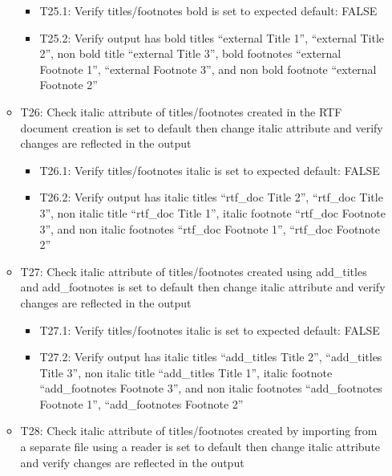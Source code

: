 \documentclass[]{article}
\providecommand{\tightlist}{%
  \setlength{\itemsep}{0pt}\setlength{\parskip}{0pt}}
\begin{document}
\begin{itemize}
\begin{itemize}
    \begin{itemize}
    \tightlist
    \item
      T25.1: Verify titles/footnotes bold is set to expected default:
      FALSE
    \item
      T25.2: Verify output has bold titles ``external Title 1'',
      ``external Title 2'', non bold title ``external Title 3'', bold
      footnotes ``external Footnote 1'', ``external Footnote 3'', and
      non bold footnote ``external Footnote 2''
    \end{itemize}
  \item
    T26: Check italic attribute of titles/footnotes created in the RTF
    document creation is set to default then change italic attribute and
    verify changes are reflected in the output

    \begin{itemize}
    \tightlist
    \item
      T26.1: Verify titles/footnotes italic is set to expected default:
      FALSE
    \item
      T26.2: Verify output has italic titles ``rtf\_doc Title 2'',
      ``rtf\_doc Title 3'', non italic title ``rtf\_doc Title 1'',
      italic footnote ``rtf\_doc Footnote 3'', and non italic footnotes
      ``rtf\_doc Footnote 1'', ``rtf\_doc Footnote 2''
    \end{itemize}
  \item
    T27: Check italic attribute of titles/footnotes created using
    add\_titles and add\_footnotes is set to default then change italic
    attribute and verify changes are reflected in the output

    \begin{itemize}
    \tightlist
    \item
      T27.1: Verify titles/footnotes italic is set to expected default:
      FALSE
    \item
      T27.2: Verify output has italic titles ``add\_titles Title 2'',
      ``add\_titles Title 3'', non italic title ``add\_titles Title 1'',
      italic footnote ``add\_footnotes Footnote 3'', and non italic
      footnotes ``add\_footnotes Footnote 1'', ``add\_footnotes Footnote
      2''
    \end{itemize}
  \item
    T28: Check italic attribute of titles/footnotes created by importing
    from a separate file using a reader is set to default then change
    italic attribute and verify changes are reflected in the output


\end{itemize}
\end{itemize}
\end{document}
